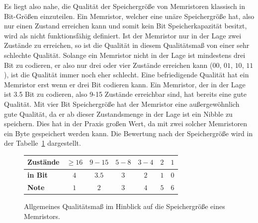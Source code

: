   Es liegt also nahe, die Qualität der Speichergröße von Memristoren klassisch in Bit-Größen einzuteilen. Ein Memristor, welcher eine unäre Speichergröße hat, also nur einen Zustand erreichen kann und somit kein Bit Speicherkapazität besitzt, wird als nicht funktionsfähig definiert. Ist der Memristor nur in der Lage zwei Zustände zu erreichen, so ist die Qualität in diesem Qualitätsmaß von einer sehr schlechte Qualität. Solange ein Memristor nicht in der Lage ist mindestens drei Bit zu codieren, er also nur drei oder vier Zustände erreichen kann ($00$, $01$, $10$, $11$), ist die Qualität immer noch eher schlecht. Eine befriedigende Qualität hat ein Memristor erst wenn er drei Bit codieren kann. Ein Memristor, der in der Lage ist 3.5 Bit zu codieren, also 9-15 Zustände erreichbar sind, hat bereits eine gute Qualität. Mit vier Bit Speichergröße hat der Memristor eine außergewöhnlich gute Qualität, da er ab dieser Zustandsmenge in der Lage ist ein Nibble zu speichern. Dies hat in der Praxis großen Wert, da mit zwei solcher Memristoren ein Byte gespeichert werden kann. Die Bewertung nach der Speichergröße wird in der Tabelle~\ref{tab:Speicher} dargestellt.
  \begin{figure}
    \centering
    \begin{tabular}{l|c|c|c|c|c|c}
      \textbf{Zustände} & $\geq16$ & $9-15$ & $5-8$ & $3-4$ & $2$ & $1$ \\\hline
      \textbf{in Bit} & $4$ & $3.5$ & $3$ & $2$ & $1$ & $0$ \\\hline
      \textbf{Note} & $1$ & $2$ & $3$ & $4$ & $5$ & $6$
    \end{tabular}
    \caption{Allgemeines Qualitätsmaß im Hinblick auf die Speichergröße eines Memristors.}
    \label{tab:Speicher}
  \end{figure}

